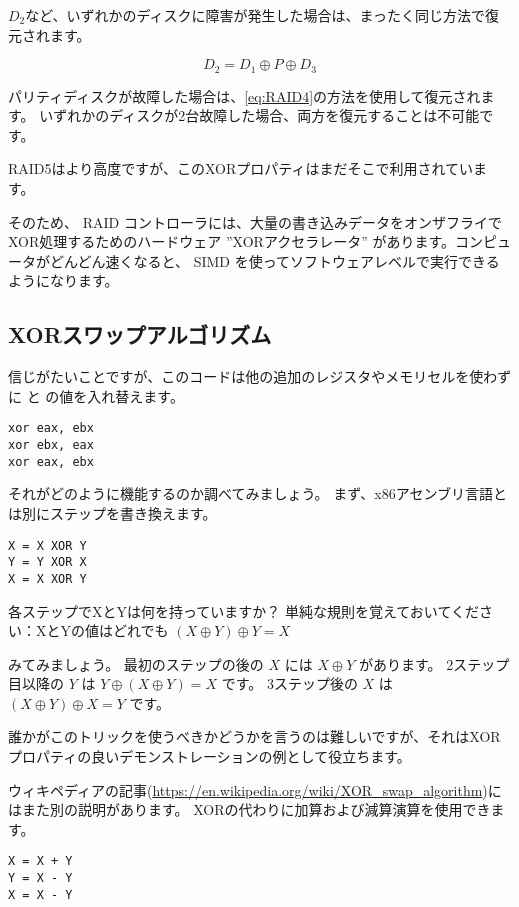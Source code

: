 $D_2$など、いずれかのディスクに障害が発生した場合は、まったく同じ方法で復元されます。

\begin{equation}
D_2 = D_1 \oplus P \oplus D_3
\end{equation}

パリティディスクが故障した場合は、\ref{eq:RAID4}の方法を使用して復元されます。
いずれかのディスクが2台故障した場合、両方を復元することは不可能です。

\ac{RAID}5はより高度ですが、このXORプロパティはまだそこで利用されています。

そのため、 \ac{RAID} コントローラには、大量の書き込みデータをオンザフライでXOR処理するためのハードウェア 
''XORアクセラレータ'' があります。コンピュータがどんどん速くなると、 \ac{SIMD} を使ってソフトウェアレベルで実行できるようになります。

\subsection{XORスワップアルゴリズム}

信じがたいことですが、このコードは他の追加のレジスタやメモリセルを使わずに \EAX と \EBX の値を入れ替えます。

\begin{lstlisting}[style=customasmx86]
xor eax, ebx
xor ebx, eax
xor eax, ebx
\end{lstlisting}

それがどのように機能するのか調べてみましょう。
まず、x86アセンブリ言語とは別にステップを書き換えます。

\begin{lstlisting}
X = X XOR Y
Y = Y XOR X
X = X XOR Y
\end{lstlisting}

各ステップでXとYは何を持っていますか？
単純な規則を覚えておいてください：XとYの値はどれでも $(X \oplus Y) \oplus Y = X$

みてみましょう。
最初のステップの後の $X$ には $X \oplus Y$ があります。
2ステップ目以降の $Y$ は $Y \oplus (X \oplus Y) = X$ です。
3ステップ後の $X$ は $(X \oplus Y) \oplus X = Y$ です。

誰かがこのトリックを使うべきかどうかを言うのは難しいですが、それはXORプロパティの良いデモンストレーションの例として役立ちます。

ウィキペディアの記事(\url{https://en.wikipedia.org/wiki/XOR_swap_algorithm})にはまた別の説明があります。
XORの代わりに加算および減算演算を使用できます。

\begin{lstlisting}
X = X + Y
Y = X - Y
X = X - Y
\end{lstlisting}

